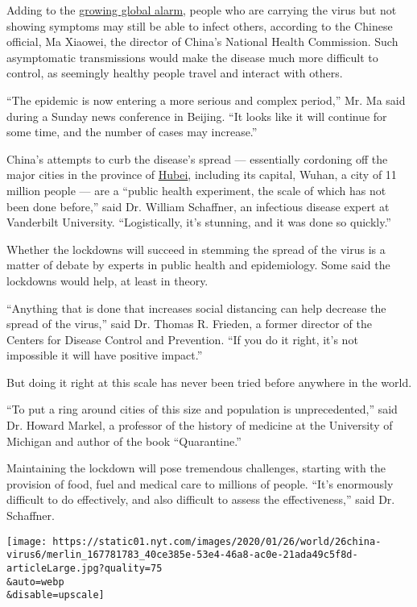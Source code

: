 Adding to the
\href{https://www.nytimes.com/2020/02/19/world/asia/china-coronavirus.html}{growing
global alarm}, people who are carrying the virus but not showing
symptoms may still be able to infect others, according to the Chinese
official, Ma Xiaowei, the director of China's National Health
Commission. Such asymptomatic transmissions would make the disease much
more difficult to control, as seemingly healthy people travel and
interact with others.

``The epidemic is now entering a more serious and complex period,'' Mr.
Ma said during a Sunday news conference in Beijing. ``It looks like it
will continue for some time, and the number of cases may increase.''

China's attempts to curb the disease's spread --- essentially cordoning
off the major cities in the province of
\href{https://www.nytimes.com/2020/07/03/world/asia/china-floods-rain.html}{Hubei},
including its capital, Wuhan, a city of 11 million people --- are a
``public health experiment, the scale of which has not been done
before,'' said Dr. William Schaffner, an infectious disease expert at
Vanderbilt University. ``Logistically, it's stunning, and it was done so
quickly.''

Whether the lockdowns will succeed in stemming the spread of the virus
is a matter of debate by experts in public health and epidemiology. Some
said the lockdowns would help, at least in theory.

``Anything that is done that increases social distancing can help
decrease the spread of the virus,'' said Dr. Thomas R. Frieden, a former
director of the Centers for Disease Control and Prevention. ``If you do
it right, it's not impossible it will have positive impact.''

But doing it right at this scale has never been tried before anywhere in
the world.

``To put a ring around cities of this size and population is
unprecedented,'' said Dr. Howard Markel, a professor of the history of
medicine at the University of Michigan and author of the book
``Quarantine.''

Maintaining the lockdown will pose tremendous challenges, starting with
the provision of food, fuel and medical care to millions of people.
``It's enormously difficult to do effectively, and also difficult to
assess the effectiveness,'' said Dr. Schaffner.

\texttt{[image: https://static01.nyt.com/images/2020/01/26/world/26china-virus6/merlin\_167781783\_40ce385e-53e4-46a8-ac0e-21ada49c5f8d-articleLarge.jpg?quality=75\\\&auto=webp\\\&disable=upscale]}

